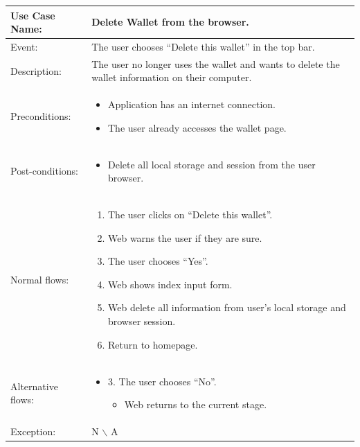 \begin{table}[]
    \begin{tabular}{| m{4cm} | m{11cm} |}
        \hline
        Use Case Name:     & Delete Wallet from the browser.                                                                  \\ \hline
        Event:             & The user chooses “Delete this wallet” in the top bar.                                            \\ \hline
        Description:       & The user no longer uses the wallet and wants to delete the wallet information on their computer. \\ \hline
        Preconditions:     & \begin{itemize}
            \item Application has an internet connection.
            \item The user already accesses the wallet page.
        \end{itemize}                                                                       \\ \hline
        Post-conditions:   & \begin{itemize}
            \item Delete all local storage and session from the user browser.
        \end{itemize}                                                                       \\ \hline
        Normal flows:      & \begin{enumerate}
            \item The user clicks on “Delete this wallet”.
            \item Web warns the user if they are sure.
            \item The user chooses “Yes”.
            \item Web shows index input form.
            \item Web delete all information from user's local storage and browser session.
            \item Return to homepage.
        \end{enumerate}                                                                       \\ \hline
        Alternative flows: & \begin{itemize}
            \item {3. The user chooses “No”.}
                  \begin{itemize}
                      \item Web returns to the current stage.
                  \end{itemize}
        \end{itemize}                                                                       \\ \hline
        Exception:         & N $\backslash$ A                                                                                 \\ \hline
    \end{tabular}
\end{table}
\clearpage

